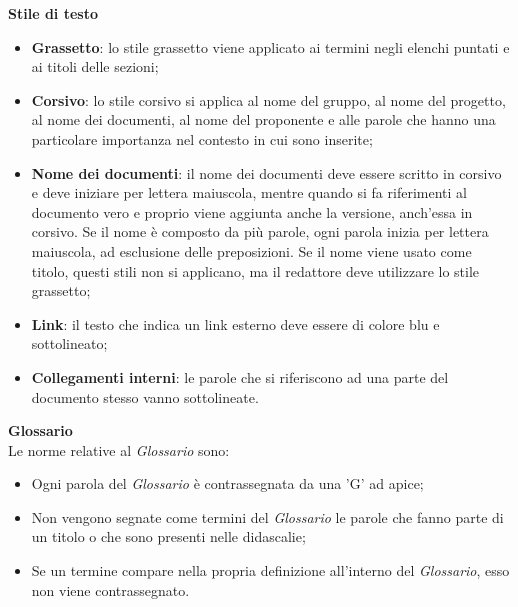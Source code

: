 \textbf{Stile di testo}
\begin{itemize}

	\item \textbf{Grassetto}: lo stile grassetto viene applicato ai termini negli elenchi puntati e ai titoli delle sezioni;
	
	\item \textbf{Corsivo}: lo stile corsivo si applica al nome del gruppo, al nome del progetto, al nome dei documenti, al nome del proponente e alle parole che hanno una particolare importanza nel contesto in cui sono inserite;
	
	\item \textbf{Nome dei documenti}: il nome dei documenti deve essere scritto in corsivo e deve iniziare per lettera maiuscola, mentre quando si fa riferimenti al documento vero e proprio viene aggiunta anche la versione, anch'essa in corsivo. Se il nome è composto da più parole, ogni parola inizia per lettera maiuscola, ad esclusione delle preposizioni.  Se il nome viene usato come titolo, questi stili non si applicano, ma il redattore deve utilizzare lo stile grassetto;
	
	\item \textbf{Link}: il testo che indica un link esterno deve essere di colore blu e sottolineato;
	
	\item \textbf{Collegamenti interni}: le parole che si riferiscono ad una parte del documento stesso vanno sottolineate.

\end{itemize}

\mbox{}

\textbf{Glossario}\\
Le norme relative al \textit{Glossario} sono:
\begin{itemize}

	\item Ogni parola del \textit{Glossario} è contrassegnata da una 'G' ad apice;
	
	\item Non vengono segnate come termini del \textit{Glossario} le parole che fanno parte di un titolo o che sono presenti nelle didascalie;
	
	\item Se un termine compare nella propria definizione all'interno del \textit{Glossario}, esso non viene contrassegnato.

\end{itemize}

